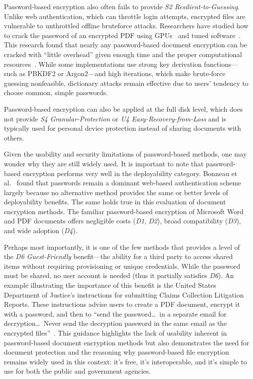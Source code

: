Password-based encryption also often fails to provide \emph{S2 Resilient-to-Guessing}. Unlike web authentication, which can throttle login attempts, encrypted files are vulnerable to unthrottled offline bruteforce attacks. Researchers have studied how to crack the password of an encrypted PDF using GPUs~\cite{danczul_cuteforce_2013} and tuned software~\cite{hranicky_experimental_2024}. This research found that nearly any password-based document encryption can be cracked with ``little overhead'' given enough time and the proper computational resources~\cite{danczul_cuteforce_2013}. While some implementations use strong key derivation functions---such as PBKDF2 or Argon2---and high iterations, which make brute-force guessing nonfeasible, dictionary attacks remain effective due to users' tendency to choose common, simple passwords.

Password-based encryption can also be applied at the full disk level, which does not provide \emph{S4 Granular-Protection} or \emph{U4 Easy-Recovery-from-Loss} and is typically used for personal device protection instead of sharing documents with others.

Given the usability and security limitations of password-based methods, one may wonder why they are still widely used. It is important to note that password-based encryption performs very well in the deployability category. Bonneau et al.~\cite{bonneau_quest_2012} found that passwords remain a dominant web-based authentication scheme largely because no alternative method provides the same or better levels of deployability benefits. The same holds true in this evaluation of document encryption methods. The familiar password-based encryption of Microsoft Word and PDF documents offers negligible costs (\emph{D1}, \emph{D2}), broad compatibility (\emph{D3}), and wide adoption (\emph{D4}).

Perhaps most importantly, it is one of the few methods that provides a level of the \emph{D6 Guest-Friendly} benefit---the ability for a third party to access shared items without requiring provisioning or unique credentials. While the password must be shared, no user account is needed (thus it partially satisfies \emph{D6}). An example illustrating the importance of this benefit is the United States Department of Justice's instructions for submitting Claims Collection Litigation Reports. These instructions advise users to create a PDF document, encrypt it with a password, and then to ``send the password\ldots\ in a separate email for decryption\ldots\ Never send the decryption password in the same email as the encrypted files''~\cite{doj_claims}. This guidance highlights the lack of usability inherent in password-based document encryption methods but also demonstrates the need for document protection and the reasoning why password-based file encryption remains widely used in this context: it's free, it's interoperable, and it's simple to use for both the public and government agencies.

